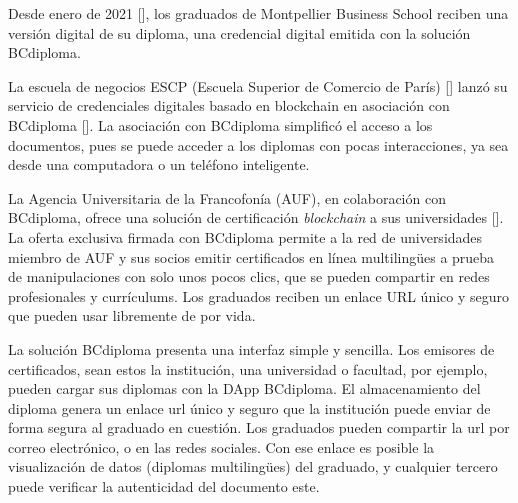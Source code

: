Desde enero de 2021 [\cite{75, 78}], los graduados de Montpellier Business School reciben una versión digital de su diploma, una credencial digital emitida con la solución BCdiploma.

La escuela de negocios ESCP (Escuela Superior de Comercio de París) [\cite{74}] lanzó su servicio de credenciales digitales basado en blockchain en asociación con BCdiploma [\cite{75}]. La asociación con BCdiploma simplificó el acceso a los documentos, pues se puede acceder a los diplomas con pocas interacciones, ya sea desde una computadora o un teléfono inteligente.

La Agencia Universitaria de la Francofonía (AUF), en colaboración con BCdiploma, ofrece una solución de certificación \textit{blockchain} a sus universidades [\cite{77}]. La oferta exclusiva firmada con BCdiploma permite a la red de universidades miembro de AUF y sus socios emitir certificados en línea multilingües a prueba de manipulaciones con solo unos pocos clics, que se pueden compartir en redes profesionales y currículums. Los graduados reciben un enlace URL único y seguro que pueden usar libremente de por vida.


La solución BCdiploma presenta una interfaz simple y sencilla. Los emisores de certificados, sean estos la institución, una universidad o facultad, por ejemplo, pueden cargar sus diplomas con la DApp BCdiploma. El almacenamiento del diploma genera un enlace url único y seguro que la institución puede enviar de forma segura al graduado en cuestión. Los graduados pueden compartir la url por correo electrónico, o en las redes sociales. Con ese enlace es posible la visualización de datos (diplomas multilingües) del graduado, y cualquier tercero puede verificar la autenticidad del documento este. 

%

